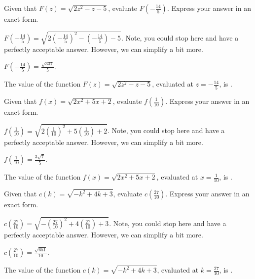 \begin{shuffle} %
\begin{exercise}
Given that $F(z)=\sqrt{2 z^2-z-5}$, evaluate $F\left(-\frac{14}{5}\right)$. Express your answer in an exact form.
\begin{solution}
\begin{hint}
$F\left(-\frac{14}{5}\right)=\sqrt{2 (-\frac{14}{5})^2-(-\frac{14}{5})-5}$. Note, you could stop here and have a perfectly acceptable answer. However, we can simplify a bit more. 
\end{hint}
\begin{hint}
$F\left(-\frac{14}{5}\right)=\frac{\sqrt{337}}{5}$.
\end{hint}
The value of the function $F(z)=\sqrt{2 z^2-z-5}$, evaluated at $z=-\frac{14}{5}$, is .
\end{solution}
\end{exercise}

\begin{exercise}
Given that $f(x)=\sqrt{2 x^2+5 x+2}$, evaluate $f\left(\frac{1}{10}\right)$. Express your answer in an exact form.
\begin{solution}
\begin{hint}
$f\left(\frac{1}{10}\right)=\sqrt{2 (\frac{1}{10})^2+5 (\frac{1}{10})+2}$. Note, you could stop here and have a perfectly acceptable answer. However, we can simplify a bit more. 
\end{hint}
\begin{hint}
$f\left(\frac{1}{10}\right)=\frac{3 \sqrt{7}}{5}$.
\end{hint}
The value of the function $f(x)=\sqrt{2 x^2+5 x+2}$, evaluated at $x=\frac{1}{10}$, is .
\end{solution}
\end{exercise}

\begin{exercise}
Given that $c(k)=\sqrt{-k^2+4 k+3}$, evaluate $c\left(\frac{27}{10}\right)$. Express your answer in an exact form.
\begin{solution}
\begin{hint}
$c\left(\frac{27}{10}\right)=\sqrt{-(\frac{27}{10})^2+4 (\frac{27}{10})+3}$. Note, you could stop here and have a perfectly acceptable answer. However, we can simplify a bit more. 
\end{hint}
\begin{hint}
$c\left(\frac{27}{10}\right)=\frac{\sqrt{651}}{10}$.
\end{hint}
The value of the function $c(k)=\sqrt{-k^2+4 k+3}$, evaluated at $k=\frac{27}{10}$, is .
\end{solution}
\end{exercise}


\end{shuffle}
